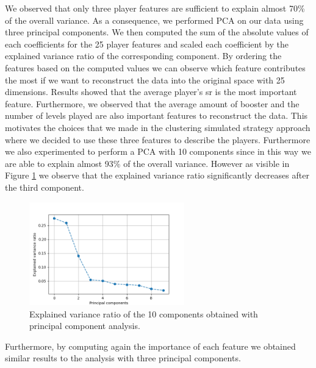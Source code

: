 We observed that only three player features are sufficient to explain almost 70\% of the overall variance. As a consequence, we performed \acf{PCA} on our data using three principal components. We then computed the sum of the absolute values of each coefficients for the 25 player features and scaled each coefficient by the explained variance ratio of the corresponding component. By ordering the features based on the computed values we can observe which feature contributes the most if we want to reconstruct the data into the original space with 25 dimensions. Results showed that the average player's \acs{sr} is the most important feature. Furthermore, we observed that the average amount of booster and the number of levels played are also important features to reconstruct the data. This motivates the choices that we made in the clustering simulated strategy approach where we decided to use these three features to describe the players. 
Furthermore we also experimented to perform a \acs{PCA} with 10 components since in this way we are able to explain almost 93\% of the overall variance. However as visible in Figure \ref{fig:pca_10} we observe that the explained variance ratio significantly decreases after the third component. 
\begin{figure}[!h]
  \centering
    \includegraphics[width=0.6\textwidth]{masters-thesis-master/masters-thesis/contents/04_results/pre_data_analysis/pca10.png}
    \caption{Explained variance ratio of the 10 components obtained with principal component analysis.}
    \label{fig:pca_10}
\end{figure}
Furthermore, by computing again the importance of each feature we obtained similar results to the analysis with three principal components.

